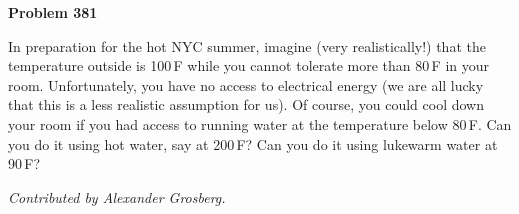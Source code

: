 \documentclass[12pt]{article}
\begin{document}
\begin{pottproblem}
\textbf{Problem 381}

In preparation for the hot NYC summer, imagine (very realistically!)
that the temperature outside is 100\,F while you cannot tolerate more
than 80\,F in your room. Unfortunately, you have no access to
electrical energy (we are all lucky that this is a less realistic
assumption for us). Of course, you could cool down your room if you
had access to running water at the temperature below 80\,F. Can you
do it using hot water, say at 200\,F? Can you do it using lukewarm
water at 90\,F?

{\normalsize\emph{Contributed by Alexander Grosberg.}}
\end{pottproblem}
\end{document}
